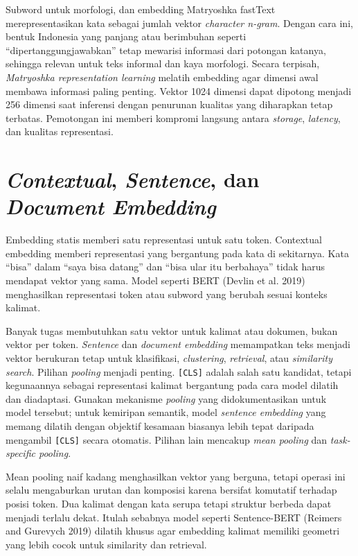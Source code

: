 \begin{pendalaman}{Subword untuk morfologi, dan embedding Matryoshka}
fastText merepresentasikan kata sebagai jumlah vektor \emph{character n-gram}. Dengan cara ini, bentuk Indonesia yang panjang atau berimbuhan seperti ``dipertanggungjawabkan'' tetap mewarisi informasi dari potongan katanya, sehingga relevan untuk teks informal dan kaya morfologi. Secara terpisah, \emph{Matryoshka representation learning} melatih embedding agar dimensi awal membawa informasi paling penting. Vektor 1024 dimensi dapat dipotong menjadi 256 dimensi saat inferensi dengan penurunan kualitas yang diharapkan tetap terbatas. Pemotongan ini memberi kompromi langsung antara \emph{storage}, \emph{latency}, dan kualitas representasi.
\end{pendalaman}

\section{\texorpdfstring{\emph{Contextual}, \emph{Sentence}, dan \emph{Document Embedding}}{Contextual, Sentence, dan Document Embedding}}\label{contextual-sentence-dan-document-embedding}

Embedding statis memberi satu representasi untuk satu token. Contextual embedding memberi representasi yang bergantung pada kata di sekitarnya. Kata ``bisa'' dalam ``saya bisa datang'' dan ``bisa ular itu berbahaya'' tidak harus mendapat vektor yang sama. Model seperti BERT (Devlin et al. 2019) menghasilkan representasi token atau subword yang berubah sesuai konteks kalimat.

Banyak tugas membutuhkan satu vektor untuk kalimat atau dokumen, bukan vektor per token. \emph{Sentence} dan \emph{document embedding} memampatkan teks menjadi vektor berukuran tetap untuk klasifikasi, \emph{clustering}, \emph{retrieval}, atau \emph{similarity search}. Pilihan \emph{pooling} menjadi penting. \passthrough{\lstinline![CLS]!} adalah salah satu kandidat, tetapi kegunaannya sebagai representasi kalimat bergantung pada cara model dilatih dan diadaptasi. Gunakan mekanisme \emph{pooling} yang didokumentasikan untuk model tersebut; untuk kemiripan semantik, model \emph{sentence embedding} yang memang dilatih dengan objektif kesamaan biasanya lebih tepat daripada mengambil \passthrough{\lstinline![CLS]!} secara otomatis. Pilihan lain mencakup \emph{mean pooling} dan \emph{task-specific pooling}.

Mean pooling naif kadang menghasilkan vektor yang berguna, tetapi operasi ini selalu mengaburkan urutan dan komposisi karena bersifat komutatif terhadap posisi token. Dua kalimat dengan kata serupa tetapi struktur berbeda dapat menjadi terlalu dekat. Itulah sebabnya model seperti Sentence-BERT (Reimers and Gurevych 2019) dilatih khusus agar embedding kalimat memiliki geometri yang lebih cocok untuk similarity dan retrieval.

